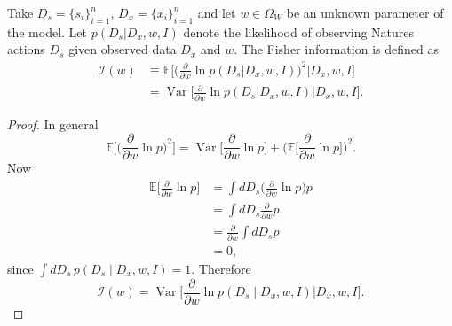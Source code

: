 \begin{definition}
	\label{def:fisher_information}
	Take $D_s= \{s_i\}_{i=1}^n$, $D_x= \{x_i\}_{i=1}^n$ and let $w \in \Omega_W$ be an unknown parameter of the model. Let $p(D_s | D_x, w, I)$ denote the likelihood of observing Natures actions $D_s$ given observed data $D_x$ and $w$. The Fisher information is defined as
	\begin{equation}
		\begin{split}
			\mathcal{I}(w) &\equiv \mathbb{E} \bigg[\bigg(\frac{\partial}{\partial w} \ln p(D_s|D_x, w,I)\bigg)^2 \Bigg| D_x, w,I\bigg]\\
			&= \operatorname{Var}\bigg[\frac{\partial}{\partial w} \ln p(D_s|D_x, w,I) \Bigg| D_x, w,I\bigg].
		\end{split}
	\end{equation}
\end{definition}

\begin{proof}
	In general
	\begin{equation}
		\mathbb{E}\bigg[\bigg(\frac{\partial}{\partial w} \ln p\bigg)^2\bigg] 
		= \operatorname{Var}\bigg[\frac{\partial}{\partial w} \ln p\bigg] + 
		\bigg(\mathbb{E}\bigg[\frac{\partial}{\partial w} \ln p\bigg]\bigg)^2.
	\end{equation}
	Now
	\begin{align}
		\mathbb{E}\bigg[\frac{\partial}{\partial w} \ln p\bigg] 
		&= \int dD_s  \bigg(\frac{\partial}{\partial w} \ln p\bigg)  p \\
		&= \int dD_s  \frac{\partial}{\partial w} p \\
		&= \frac{\partial}{\partial w} \int dD_s  p \\
		&= 0,
	\end{align}
	since $\int dD_s \, p(D_s \mid D_x, w, I) = 1$. Therefore
	\begin{equation}
		\mathcal{I}(w) = \operatorname{Var}\bigg[\frac{\partial}{\partial w} \ln p(D_s \mid D_x, w, I) \bigg| D_x, w, I\bigg].
	\end{equation}
\end{proof}

